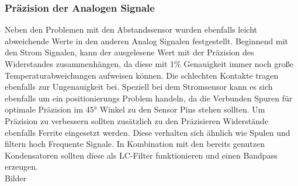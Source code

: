 \subsubsection{Präzision der Analogen Signale}
Neben den Problemen mit den Abstandssensor wurden ebenfalls leicht abweichende Werte in den anderen Analog Signalen festgestellt. Beginnend mit den Strom Signalen, kann der ausgelesene Wert mit der Präzision des Widerstandes zusammenhängen, da diese mit 1\% Genauigkeit immer noch große Temperaturabweichungen aufweisen können. Die schlechten Kontakte tragen ebenfalls zur Ungenauigkeit bei. Speziell bei dem Stromsensor kann es sich ebenfalls um ein positionierungs Problem handeln, da die Verbunden Spuren für optimale Präzision im 45° Winkel zu den Sensor Pins stehen sollten. Um Präzision zu verbessern sollten zusätzlich zu den Präzisieren Widerstände ebenfalls Ferrite eingesetzt werden. Diese verhalten sich ähnlich wie Spulen und filtern hoch Frequente Signale. In Kombination mit den bereits genutzen Kondensatoren sollten diese als LC-Filter funktionieren und einen Bandpass erzeugen.\\
Bilder
